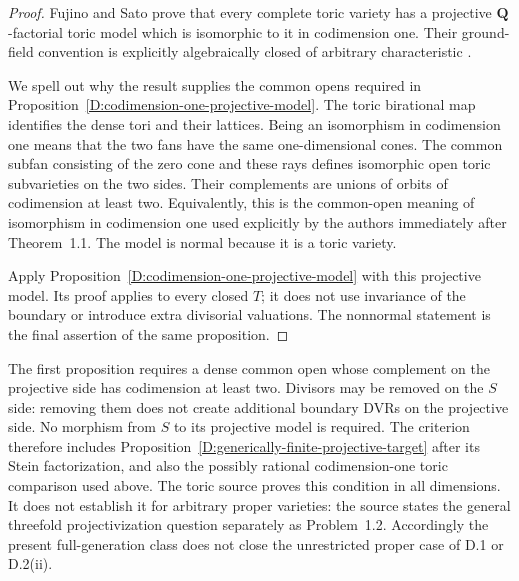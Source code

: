 \begin{proof}
Fujino and Sato prove that every complete toric variety has a
projective $\mathbf Q$-factorial toric model which is isomorphic to it
in codimension one. Their ground-field convention is explicitly
algebraically closed of arbitrary characteristic
\citep[Theorem~1.1, p.~1; Theorem~1.3, p.~2; full proof in
Section~3, pp.~6--7]{FujinoSato2025D}.

We spell out why the result supplies the common opens required in
Proposition~\ref{D:codimension-one-projective-model}. The toric
birational map identifies the dense tori and their lattices. Being
an isomorphism in codimension one means that the two fans have the
same one-dimensional cones. The common subfan consisting of the
zero cone and these rays defines isomorphic open toric subvarieties
on the two sides. Their complements are unions of orbits of
codimension at least two. Equivalently, this is the common-open
meaning of isomorphism in codimension one used explicitly by the
authors immediately after Theorem~1.1. The model is normal because
it is a toric variety.

Apply Proposition~\ref{D:codimension-one-projective-model} with this
projective model. Its proof applies to every closed $T$; it does not
use invariance of the boundary or introduce extra divisorial
valuations. The nonnormal statement is the final assertion of the
same proposition.
\end{proof}

\begin{remark}
The first proposition requires a dense common open whose complement
on the projective side has codimension at least two. Divisors may be
removed on the $S$ side: removing them does not create additional
boundary DVRs on the projective side. No morphism from $S$ to its
projective model is required. The criterion therefore includes
Proposition~\ref{D:generically-finite-projective-target} after its
Stein factorization, and also the possibly rational codimension-one
toric comparison used above.
The toric source proves this condition in all dimensions. It does
not establish it for arbitrary proper varieties: the source states
the general threefold projectivization question separately as
Problem~1.2. Accordingly the present full-generation class does not
close the unrestricted proper case of D.1 or D.2(ii).
\end{remark}
